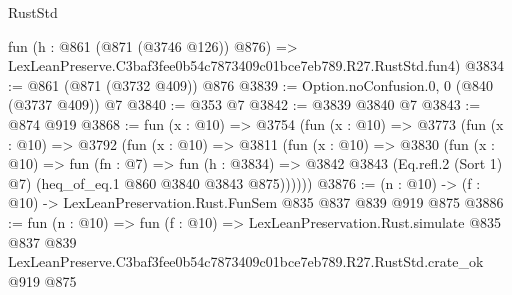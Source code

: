 \begin{lexlean}{RustStd}
\begin{coremodule}
    fun (h : @861 (@871 (@3746 @126)) @876) =>
    LexLeanPreserve.C3baf3fee0b54c7873409c01bce7eb789.R27.RustStd.fun4)
@3834 := @861 (@871 (@3732 @409)) @876
@3839 := Option.noConfusion.{0, 0} (@840 (@3737 @409)) @7
@3840 := @353 @7
@3842 := @3839 @3840 @7
@3843 := @874 @919
@3868 := fun (x : @10) =>
  @3754
    (fun (x : @10) =>
    @3773
      (fun (x : @10) =>
      @3792
        (fun (x : @10) =>
        @3811
          (fun (x : @10) =>
          @3830
            (fun (x : @10) =>
            fun (fn : @7) =>
            fun (h : @3834) =>
            @3842 @3843 (Eq.refl.{2} (Sort 1) @7) (heq_of_eq.{1} @860 @3840 @3843 @875))))))
@3876 := (n : @10) -> (f : @10) -> LexLeanPreservation.Rust.FunSem @835 @837 @839 @919 @875
@3886 := fun (n : @10) =>
  fun (f : @10) =>
  LexLeanPreservation.Rust.simulate
    @835
    @837
    @839
    LexLeanPreserve.C3baf3fee0b54c7873409c01bce7eb789.R27.RustStd.crate_ok
    @919
    @875
\end{coremodule}
\end{lexlean}
